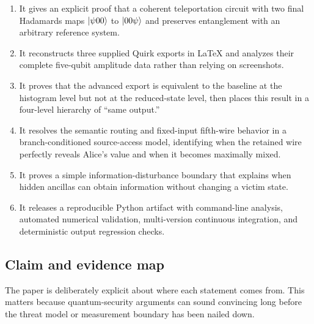 \begin{enumerate}[leftmargin=1.8em]
  \item It gives an explicit proof that a coherent teleportation circuit with
  two final Hadamards maps $\ket{\psi00}$ to $\ket{00\psi}$ and preserves
  entanglement with an arbitrary reference system.
  \item It reconstructs three supplied Quirk exports in LaTeX and analyzes their
  complete five-qubit amplitude data rather than relying on screenshots.
  \item It proves that the advanced export is equivalent to the baseline at the
  histogram level but not at the reduced-state level, then places this result in
  a four-level hierarchy of ``same output.''
  \item It resolves the semantic routing and fixed-input fifth-wire behavior in
  a branch-conditioned source-access model, identifying when the retained wire
  perfectly reveals Alice's value and when it becomes maximally mixed.
  \item It proves a simple information-disturbance boundary that explains when
  hidden ancillas can obtain information without changing a victim state.
  \item It releases a reproducible Python artifact with command-line analysis,
  automated numerical validation, multi-version continuous integration, and
  deterministic output regression checks.
\end{enumerate}

\subsection{Claim and evidence map}

The paper is deliberately explicit about where each statement comes from. This
matters because quantum-security arguments can sound convincing long before the
threat model or measurement boundary has been nailed down.

